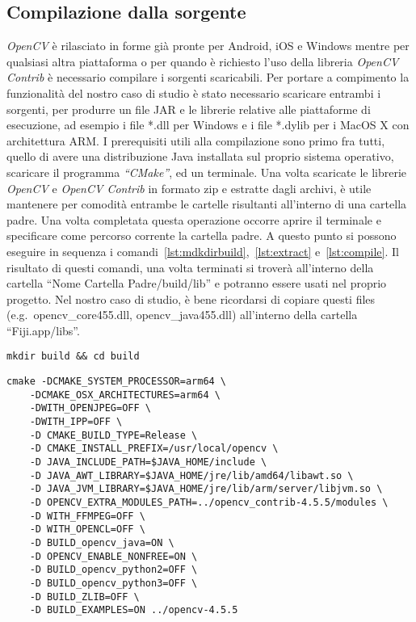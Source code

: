 \subsection{Compilazione dalla sorgente}
\noindent \textit{OpenCV} è rilasciato in forme già pronte per Android, iOS e Windows mentre per qualsiasi altra piattaforma o per quando è richiesto l'uso della libreria \textit{OpenCV Contrib} è necessario compilare i sorgenti scaricabili. Per portare a compimento la funzionalità del nostro caso di studio è stato necessario scaricare entrambi i sorgenti, per produrre un file JAR e le librerie relative alle piattaforme di esecuzione, ad esempio i file *.dll per Windows e i file *.dylib per i MacOS X con architettura ARM\@.
I prerequisiti utili alla compilazione sono primo fra tutti, quello di avere una distribuzione Java installata sul proprio sistema operativo, scaricare il programma \textit{``CMake''}, ed un terminale. Una volta scaricate le librerie \textit{OpenCV} e \textit{OpenCV Contrib} in formato zip e estratte dagli archivi, è utile mantenere per comodità entrambe le cartelle risultanti all'interno di una cartella padre. Una volta completata questa operazione occorre aprire il terminale e specificare come percorso corrente la cartella padre. A questo punto si possono eseguire in sequenza i comandi~\ref{lst:mdkdirbuild},~\ref{lst:extract} e~\ref{lst:compile}. Il risultato di questi comandi, una volta terminati si troverà all'interno della cartella ``{Nome Cartella Padre}/build/lib'' e potranno essere usati nel proprio progetto. Nel nostro caso di studio, è bene ricordarsi di copiare questi files (e.g.\ opencv\_core455.dll, opencv\_java455.dll) all'interno della cartella ``Fiji.app/libs''.

\begin{lstlisting}[label={lst:mdkdirbuild}, caption={Creazione cartella Build}]
    mkdir build && cd build
\end{lstlisting}

\begin{lstlisting}[label={lst:extract}, caption={Esempio di creazione di build estrazione dalla sorgente per piattaforma MacOs X con processore M1}]
    cmake -DCMAKE_SYSTEM_PROCESSOR=arm64 \
    -DCMAKE_OSX_ARCHITECTURES=arm64 \
    -DWITH_OPENJPEG=OFF \
    -DWITH_IPP=OFF \
    -D CMAKE_BUILD_TYPE=Release \
    -D CMAKE_INSTALL_PREFIX=/usr/local/opencv \
    -D JAVA_INCLUDE_PATH=$JAVA_HOME/include \
    -D JAVA_AWT_LIBRARY=$JAVA_HOME/jre/lib/amd64/libawt.so \
    -D JAVA_JVM_LIBRARY=$JAVA_HOME/jre/lib/arm/server/libjvm.so \
    -D OPENCV_EXTRA_MODULES_PATH=../opencv_contrib-4.5.5/modules \
    -D WITH_FFMPEG=OFF \
    -D WITH_OPENCL=OFF \
    -D BUILD_opencv_java=ON \
    -D OPENCV_ENABLE_NONFREE=ON \
    -D BUILD_opencv_python2=OFF \
    -D BUILD_opencv_python3=OFF \
    -D BUILD_ZLIB=OFF \
    -D BUILD_EXAMPLES=ON ../opencv-4.5.5
\end{lstlisting}

